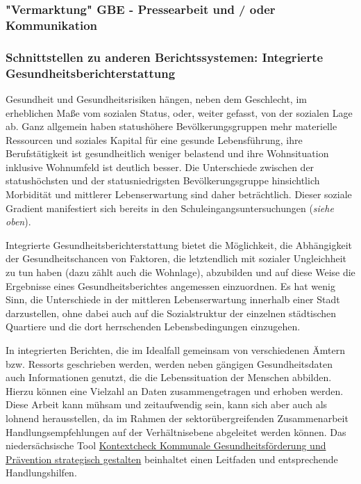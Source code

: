\documentclass{article}
\begin{document}
\subsubsection{"Vermarktung" GBE - Pressearbeit und / oder Kommunikation }\label{H5951033}






\subsubsection{\textbf{Schnittstellen zu anderen Berichtssystemen:}\textbf{ Integrierte Gesundheitsberichterstattung}}\label{H2446639}



Gesundheit und Gesundheitsrisiken hängen, neben dem Geschlecht, im erheblichen Maße vom sozialen Status, oder, weiter gefasst, von der sozialen Lage ab. Ganz allgemein haben statushöhere Bevölkerungsgruppen mehr materielle Ressourcen und soziales Kapital für eine gesunde Lebensführung, ihre Berufstätigkeit ist gesundheitlich weniger belastend und ihre Wohnsituation inklusive Wohnumfeld ist deutlich besser. Die Unterschiede zwischen der statushöchsten und der statusniedrigsten Bevölkerungsgruppe hinsichtlich Morbidität und mittlerer  Lebenserwartung sind daher beträchtlich. Dieser soziale Gradient manifestiert sich bereits in den Schuleingangsuntersuchungen (\emph{siehe oben}).


Integrierte Gesundheitsberichterstattung bietet die Möglichkeit, die Abhängigkeit der Gesundheitschancen von Faktoren, die letztendlich mit sozialer Ungleichheit zu tun haben (dazu zählt auch die Wohnlage), abzubilden und auf diese Weise die Ergebnisse eines Gesundheitsberichtes angemessen einzuordnen. Es hat wenig Sinn, die Unterschiede in der mittleren Lebenserwartung innerhalb einer Stadt darzustellen, ohne dabei auch auf die Sozialstruktur der einzelnen städtischen Quartiere und die dort herrschenden Lebensbedingungen einzugehen. 


In integrierten Berichten, die im Idealfall gemeinsam von verschiedenen Ämtern bzw. Ressorts geschrieben werden, werden neben gängigen Gesundheitsdaten auch Informationen genutzt, die die Lebenssituation der Menschen abbilden. Hierzu können eine Vielzahl an Daten zusammengetragen und erhoben werden. Diese Arbeit kann mühsam und zeitaufwendig sein, kann sich aber auch als lohnend herausstellen, da im Rahmen der sektorübergreifenden Zusammenarbeit Handlungsempfehlungen auf der Verhältnisebene abgeleitet werden können. Das niedersächsische Tool \href{https://www.kontextcheck.de/}{Kontextcheck Kommunale Gesundheitsförderung und Prävention strategisch gestalten} beinhaltet einen Leitfaden und entsprechende Handlungshilfen. 
\end{document}
